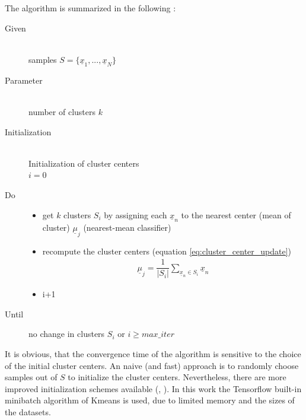\documentclass[12pt,DIV14,BCOR12mm,a4paper,footexclude,headinclude,halfparskip-,twoside,openright,cleardoubleempty,idxtotoc,bibtotoc,listtotoc]{scrreprt} %
\numberwithin{equation}{chapter}
\begin{document}
The algorithm is summarized in the following \cite{LectureNotes_DPR}:
\begin{description}
	\item[Given]\hfill \\
		samples $S = \lbrace\underline{x}_{1},...,\underline{x}_{N}\rbrace$
	\item[Parameter]\hfill \\
		number of clusters $k$
	\item[Initialization]\hfill \\
		Initialization of cluster centers\\
		$i = 0$
	\item[Do]\hfill
		\begin{itemize}
			\item get $k$ clusters $S_{i}$ by assigning each $\underline{x}_{n}$ to the nearest center (mean of cluster) $\underline{\mu}_{j}$ (nearest-mean classifier)
			\item recompute the cluster centers (equation \ref{eq:cluster_center_update})
				\begin{align}
					\underline{\mu}_{j} = \dfrac{1}{|S_{i}|} \sum_{\underline{x}_{n} \in S_{i}}\underline{x}_{n}\label{eq:cluster_center_update}
				\end{align}
			\item i+1
		\end{itemize}
	\item[Until] no change in clusters $S_{i}$ or $i \geq max\_iter$
\end{description}
It is obvious, that the convergence time of the algorithm is sensitive to the choice of the initial cluster centers. An naive (and fast) approach is to randomly choose samples out of $S$ to initialize the cluster centers. Nevertheless, there are more improved initialization schemes available (\cite{Yi10ImprovedInitialization}, \cite{Arthuer07kmeans_plusplus}). In this work the Tensorflow built-in minibatch algorithm of Kmeans is used, due to limited memory and the sizes of the datasets.
\end{document}
